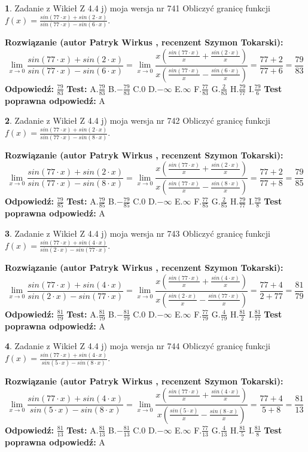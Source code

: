 \documentclass[12pt, a4paper]{article}
\theoremstyle{definition} %
\newtheorem{zad}{}
\newcommand{\zadStart}[1]{\begin{zad}#1\newline}
\newcommand{\zadStop}{\end{zad}}
\newcommand{\rozwStart}[2]{\noindent \textbf{Rozwiązanie (autor #1 , recenzent #2): }\newline}
\newcommand{\rozwStop}{\newline}
\newcommand{\odpStart}{\noindent \textbf{Odpowiedź:}\newline}
\newcommand{\odpStop}{\newline}
\newcommand{\testStart}{\noindent \textbf{Test:}\newline}
\newcommand{\testStop}{\newline}
\newcommand{\kluczStart}{\noindent \textbf{Test poprawna odpowiedź:}\newline}
\newcommand{\kluczStop}{\newline}
\begin{document}
\zadStart{Zadanie z Wikieł Z 4.4 j) moja wersja nr 741}
Obliczyć granicę funkcji $f(x)=\frac{sin(77\cdot x) +sin(2\cdot x)}{sin(77\cdot x) -sin(6\cdot x)}$.
\zadStop
\rozwStart{Patryk Wirkus}{Szymon Tokarski}
$$\lim\limits_{x\to 0}\frac{sin(77\cdot x) +sin(2\cdot x)}{sin(77\cdot x) -sin(6\cdot x)}=\lim\limits_{x\to 0}\frac{x(\frac{sin(77\cdot x)}{x}+\frac{sin(2\cdot x)}{x})}{x(\frac{sin(77\cdot x)}{x}-\frac{sin(6\cdot x)}{x})}=\frac{77+2}{77+6} = \frac{79}{83}$$
\rozwStop
\odpStart
$\frac{79}{83}$
\odpStop
\testStart
A.$\frac{79}{83}$
B.$-\frac{79}{83}$
C.$0$
D.$-\infty$
E.$\infty$
F.$\frac{77}{83}$
G.$\frac{2}{83}$
H.$\frac{79}{77}$
I.$\frac{79}{6}$
\testStop
\kluczStart
A
\kluczStop



\zadStart{Zadanie z Wikieł Z 4.4 j) moja wersja nr 742}
Obliczyć granicę funkcji $f(x)=\frac{sin(77\cdot x) +sin(2\cdot x)}{sin(77\cdot x) -sin(8\cdot x)}$.
\zadStop
\rozwStart{Patryk Wirkus}{Szymon Tokarski}
$$\lim\limits_{x\to 0}\frac{sin(77\cdot x) +sin(2\cdot x)}{sin(77\cdot x) -sin(8\cdot x)}=\lim\limits_{x\to 0}\frac{x(\frac{sin(77\cdot x)}{x}+\frac{sin(2\cdot x)}{x})}{x(\frac{sin(77\cdot x)}{x}-\frac{sin(8\cdot x)}{x})}=\frac{77+2}{77+8} = \frac{79}{85}$$
\rozwStop
\odpStart
$\frac{79}{85}$
\odpStop
\testStart
A.$\frac{79}{85}$
B.$-\frac{79}{85}$
C.$0$
D.$-\infty$
E.$\infty$
F.$\frac{77}{85}$
G.$\frac{2}{85}$
H.$\frac{79}{77}$
I.$\frac{79}{8}$
\testStop
\kluczStart
A
\kluczStop



\zadStart{Zadanie z Wikieł Z 4.4 j) moja wersja nr 743}
Obliczyć granicę funkcji $f(x)=\frac{sin(77\cdot x) +sin(4\cdot x)}{sin(2\cdot x) -sin(77\cdot x)}$.
\zadStop
\rozwStart{Patryk Wirkus}{Szymon Tokarski}
$$\lim\limits_{x\to 0}\frac{sin(77\cdot x) +sin(4\cdot x)}{sin(2\cdot x) -sin(77\cdot x)}=\lim\limits_{x\to 0}\frac{x(\frac{sin(77\cdot x)}{x}+\frac{sin(4\cdot x)}{x})}{x(\frac{sin(2\cdot x)}{x}-\frac{sin(77\cdot x)}{x})}=\frac{77+4}{2+77} = \frac{81}{79}$$
\rozwStop
\odpStart
$\frac{81}{79}$
\odpStop
\testStart
A.$\frac{81}{79}$
B.$-\frac{81}{79}$
C.$0$
D.$-\infty$
E.$\infty$
F.$\frac{77}{79}$
G.$\frac{4}{79}$
H.$\frac{81}{2}$
I.$\frac{81}{77}$
\testStop
\kluczStart
A
\kluczStop



\zadStart{Zadanie z Wikieł Z 4.4 j) moja wersja nr 744}
Obliczyć granicę funkcji $f(x)=\frac{sin(77\cdot x) +sin(4\cdot x)}{sin(5\cdot x) -sin(8\cdot x)}$.
\zadStop
\rozwStart{Patryk Wirkus}{Szymon Tokarski}
$$\lim\limits_{x\to 0}\frac{sin(77\cdot x) +sin(4\cdot x)}{sin(5\cdot x) -sin(8\cdot x)}=\lim\limits_{x\to 0}\frac{x(\frac{sin(77\cdot x)}{x}+\frac{sin(4\cdot x)}{x})}{x(\frac{sin(5\cdot x)}{x}-\frac{sin(8\cdot x)}{x})}=\frac{77+4}{5+8} = \frac{81}{13}$$
\rozwStop
\odpStart
$\frac{81}{13}$
\odpStop
\testStart
A.$\frac{81}{13}$
B.$-\frac{81}{13}$
C.$0$
D.$-\infty$
E.$\infty$
F.$\frac{77}{13}$
G.$\frac{4}{13}$
H.$\frac{81}{5}$
I.$\frac{81}{8}$
\testStop
\kluczStart
A
\kluczStop
\end{document}
